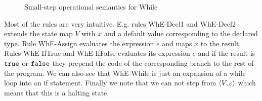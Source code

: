 \begin{figure}[h]
  \centering
  
  \RuleSpace

  
  \RuleSpace


  \RuleSpace


  \RuleSpace

  { \: \rightarrow \: }

  \RuleSpace 

  { \: \rightarrow \: }
  
  \RuleSpace


  \caption{Small-step operational semantics for While}
  \label{fig:while_sos}
\end{figure}

Most of the rules are very intuitive. E.g. rules {\sc WhE-Decl1} and {\sc
WhE-Decl2} extends the state map $V$ with $x$ and a default value corresponding
to the declared type. Rule {\sc WhE-Assign} evaluates the expression $e$ and
maps $x$ to the result. Rules {\sc WhE-IfTrue} and {\sc WhE-IfFalse} evaluates
its expression $e$ and if the result is $\mbox{\texttt{true}}$ or $\mbox{\texttt{false}}$ they prepend the
code of the corresponding branch to the rest of the program. We can also see
that {\sc WhE-While} is just an expansion of a while loop into an if statement.
Finally we note that we can not step from $\langle V, \varepsilon \rangle$ which means
that this is a halting state.

